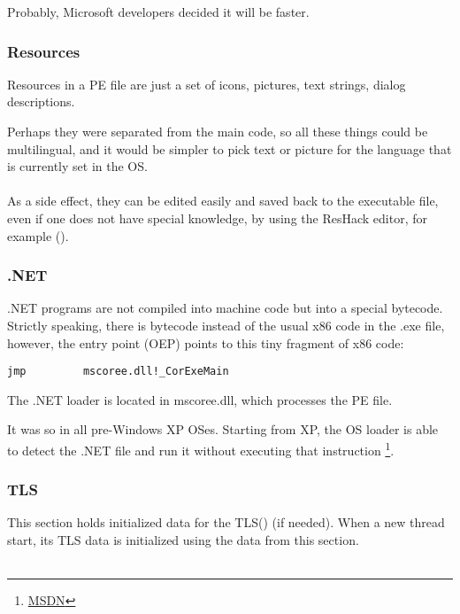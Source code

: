 Probably, Microsoft developers decided it will be faster.

\subsubsection{Resources}

\label{PEresources}

Resources in a PE file are just a set of icons, pictures, text strings, dialog descriptions.

Perhaps they were separated from the main code, so all these things could be multilingual,
and it would be simpler to pick text or picture for the language that is currently set in the \ac{OS}. \\
\\
As a side effect, they can be edited easily and saved back to the executable file, even if one does not have special knowledge, 
by using the ResHack editor, for example ().

\subsubsection{.NET}


.NET programs are not compiled into machine code but into a special bytecode.
Strictly speaking, there is bytecode instead of the usual x86 code
in the .exe file, however, the entry point (\ac{OEP}) points to this tiny fragment of x86 code:

\begin{lstlisting}
jmp         mscoree.dll!_CorExeMain
\end{lstlisting}

The .NET loader is located in mscoree.dll, which processes the PE file.

It was so in all pre-Windows XP \ac{OS}es. Starting from XP, the \ac{OS} loader is able to detect the .NET file
and run it without executing that \JMP instruction
\footnote{\href{http://go.yurichev.com/17051}{MSDN}}.

\subsubsection{TLS}

This section holds initialized data for the \ac{TLS}() (if needed).
When a new thread start, its \ac{TLS} data is initialized using the data from this section. \\
\\

